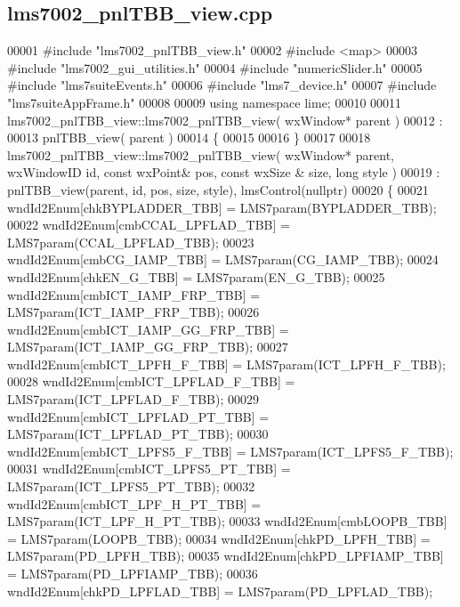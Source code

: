 \subsection{lms7002\+\_\+pnl\+T\+B\+B\+\_\+view.\+cpp}
\label{lms7002__pnlTBB__view_8cpp_source}

\begin{DoxyCode}
00001 \textcolor{preprocessor}{#include "lms7002_pnlTBB_view.h"}
00002 \textcolor{preprocessor}{#include <map>}
00003 \textcolor{preprocessor}{#include "lms7002_gui_utilities.h"}
00004 \textcolor{preprocessor}{#include "numericSlider.h"}
00005 \textcolor{preprocessor}{#include "lms7suiteEvents.h"}
00006 \textcolor{preprocessor}{#include "lms7_device.h"}
00007 \textcolor{preprocessor}{#include "lms7suiteAppFrame.h"}
00008 
00009 \textcolor{keyword}{using namespace }lime;
00010 
00011 lms7002_pnlTBB_view::lms7002_pnlTBB_view( wxWindow* parent )
00012 :
00013 pnlTBB_view( parent )
00014 \{
00015 
00016 \}
00017 
00018 lms7002_pnlTBB_view::lms7002_pnlTBB_view( wxWindow* parent, wxWindowID \textcolor{keywordtype}{id}, \textcolor{keyword}{const} wxPoint& pos, \textcolor{keyword}{const} wxSize
      & size, \textcolor{keywordtype}{long} style )
00019     : pnlTBB_view(parent, id, pos, size, style), lmsControl(nullptr)
00020 \{
00021     wndId2Enum[chkBYPLADDER_TBB] = LMS7param(BYPLADDER_TBB);
00022     wndId2Enum[cmbCCAL_LPFLAD_TBB] = LMS7param(CCAL_LPFLAD_TBB);
00023     wndId2Enum[cmbCG_IAMP_TBB] = LMS7param(CG_IAMP_TBB);
00024     wndId2Enum[chkEN_G_TBB] = LMS7param(EN_G_TBB);
00025     wndId2Enum[cmbICT_IAMP_FRP_TBB] = LMS7param(ICT_IAMP_FRP_TBB);
00026     wndId2Enum[cmbICT_IAMP_GG_FRP_TBB] = LMS7param(ICT_IAMP_GG_FRP_TBB);
00027     wndId2Enum[cmbICT_LPFH_F_TBB] = LMS7param(ICT_LPFH_F_TBB);
00028     wndId2Enum[cmbICT_LPFLAD_F_TBB] = LMS7param(ICT_LPFLAD_F_TBB);
00029     wndId2Enum[cmbICT_LPFLAD_PT_TBB] = LMS7param(ICT_LPFLAD_PT_TBB);
00030     wndId2Enum[cmbICT_LPFS5_F_TBB] = LMS7param(ICT_LPFS5_F_TBB);
00031     wndId2Enum[cmbICT_LPFS5_PT_TBB] = LMS7param(ICT_LPFS5_PT_TBB);
00032     wndId2Enum[cmbICT_LPF_H_PT_TBB] = LMS7param(ICT_LPF_H_PT_TBB);
00033     wndId2Enum[cmbLOOPB_TBB] = LMS7param(LOOPB_TBB);
00034     wndId2Enum[chkPD_LPFH_TBB] = LMS7param(PD_LPFH_TBB);
00035     wndId2Enum[chkPD_LPFIAMP_TBB] = LMS7param(PD_LPFIAMP_TBB);
00036     wndId2Enum[chkPD_LPFLAD_TBB] = LMS7param(PD_LPFLAD_TBB);

\end{DoxyCode}
